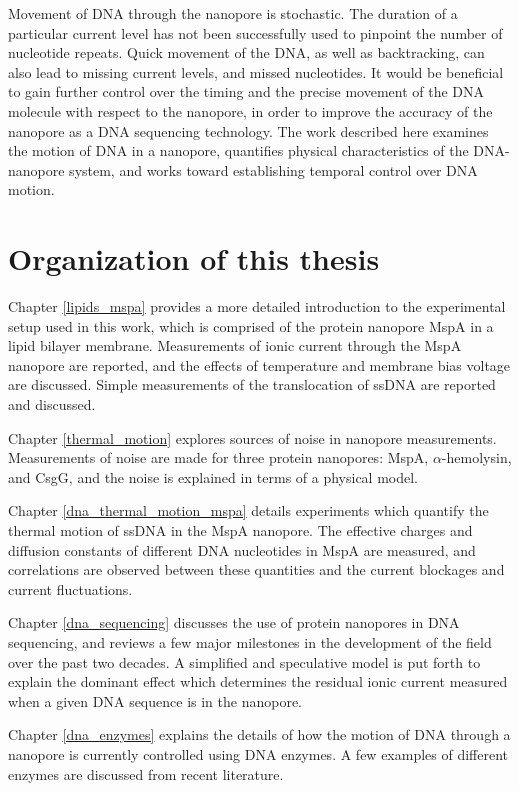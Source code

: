 Movement of DNA through the nanopore is stochastic.  The duration of a particular current level has not been successfully used to pinpoint the number of nucleotide repeats.  Quick movement of the DNA, as well as backtracking, can also lead to missing current levels, and missed nucleotides.  It would be beneficial to gain further control over the timing and the precise movement of the DNA molecule with respect to the nanopore, in order to improve the accuracy of the nanopore as a DNA sequencing technology.  The work described here examines the motion of DNA in a nanopore, quantifies physical characteristics of the DNA-nanopore system, and works toward establishing temporal control over DNA motion.

\section{Organization of this thesis}

Chapter \ref{lipids_mspa} provides a more detailed introduction to the experimental setup used in this work, which is comprised of the protein nanopore MspA in a lipid bilayer membrane.  Measurements of ionic current through the MspA nanopore are reported, and the effects of temperature and membrane bias voltage are discussed.  Simple measurements of the translocation of ssDNA are reported and discussed.

Chapter \ref{thermal_motion} explores sources of noise in nanopore measurements.  Measurements of noise are made for three protein nanopores: MspA, $\alpha$-hemolysin, and CsgG, and the noise is explained in terms of a physical model.

Chapter \ref{dna_thermal_motion_mspa} details experiments which quantify the thermal motion of ssDNA in the MspA nanopore.  The effective charges and diffusion constants of different DNA nucleotides in MspA are measured, and correlations are observed between these quantities and the current blockages and current fluctuations.

Chapter \ref{dna_sequencing} discusses the use of protein nanopores in DNA sequencing, and reviews a few major milestones in the development of the field over the past two decades.  A simplified and speculative model is put forth to explain the dominant effect which determines the residual ionic current measured when a given DNA sequence is in the nanopore.

Chapter \ref{dna_enzymes} explains the details of how the motion of DNA through a nanopore is currently controlled using DNA enzymes.  A few examples of different enzymes are discussed from recent literature.

